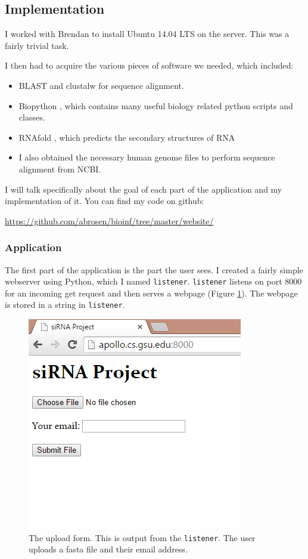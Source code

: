 \documentclass[10pt,letterpaper]{article}
\begin{document}
\subsection{Implementation}
I worked with Brendan to install Ubuntu 14.04 LTS on the server. 
This was a fairly trivial task.

I then had to acquire the various pieces of software we needed, which included:

\begin{itemize}
	\item BLAST \cite{blast} and clustalw \cite{thompson2002multiple} for sequence alignment.
	\item Biopython \cite{cock2009biopython}, which contains many useful biology related python scripts and classes.
	\item RNAfold \cite{lorenz2011viennarna},  which predicts the secondary structures of RNA
	\item I also obtained the necessary human genome files to perform sequence alignment from NCBI.
\end{itemize}

I will talk specifically about the goal of each part of the application and my implementation of it.
You can find my code on github: 

\url{https://github.com/abrosen/bioinf/tree/master/website/}

\subsubsection{Application}
The first part of the application is the part the user sees.
I created a fairly simple webserver using Python, which I named \texttt{listener}.
\texttt{listener} listens on port 8000 for an incoming get request and then serves a webpage (Figure \ref{fig:website}). 
The webpage is stored in a string in \texttt{listener}.

\begin{figure}
\centering
\includegraphics[width=0.5\linewidth]{website}
\caption{The upload form. This is output from the \texttt{listener}.  
	The user uploads a fasta file and their email address.}
\label{fig:website}
\end{figure}
\end{document}
